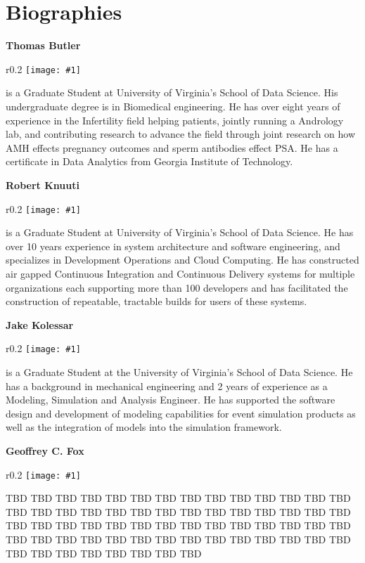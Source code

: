 \documentclass[sigplan,screen]{acmart}
\newcommand{\BIOFIG}[3]{%
\parindent 0pt%
\setlength{\intextsep}{6pt}%
\setlength{\columnsep}{6pt}%

{\bf #2}

\begin{wrapfigure}{r}{0.2\columnwidth}%
    \texttt{[image: \#1]}%
\end{wrapfigure}%
#3%
}
\begin{document}






\section*{Biographies}

\BIOFIG{images/bio/gregor.png}{Thomas Butler}{is a Graduate Student at
  University of Virginia's School of Data Science. His undergraduate
  degree is in Biomedical engineering. He has over eight years of
  experience in the Infertility field helping patients, jointly
  running a Andrology lab, and contributing research to advance the
  field through joint research on how AMH effects pregnancy outcomes
  and sperm antibodies effect PSA. He has a certificate in Data
  Analytics from Georgia Institute of Technology.}

\BIOFIG{images/bio/gregor.png}{Robert Knuuti}{is a Graduate Student at
  University of Virginia's School of Data Science. He has over 10
  years experience in system architecture and software engineering,
  and specializes in Development Operations and Cloud Computing. He
  has constructed air gapped Continuous Integration and Continuous
  Delivery systems for multiple organizations each supporting more
  than 100 developers and has facilitated the construction of
  repeatable, tractable builds for users of these systems.}

\BIOFIG{images/bio/gregor.png}{Jake Kolessar}{is a Graduate Student at
  the University of Virginia's School of Data Science. He has a
  background in mechanical engineering and 2 years of experience as a
  Modeling, Simulation and Analysis Engineer. He has supported the
  software design and development of modeling capabilities for event
  simulation products as well as the integration of models into the
  simulation framework.}

\BIOFIG{images/bio/fox.png}{Geoffrey C. Fox}{TBD TBD TBD TBD TBD
  TBD TBD TBD TBD TBD TBD TBD TBD TBD TBD TBD TBD TBD TBD TBD TBD TBD
  TBD TBD TBD TBD TBD TBD TBD TBD TBD TBD TBD TBD TBD TBD TBD TBD TBD
  TBD TBD TBD TBD TBD TBD TBD TBD TBD TBD TBD TBD TBD TBD TBD TBD TBD
  TBD TBD TBD TBD TBD TBD TBD TBD}

\end{document}
